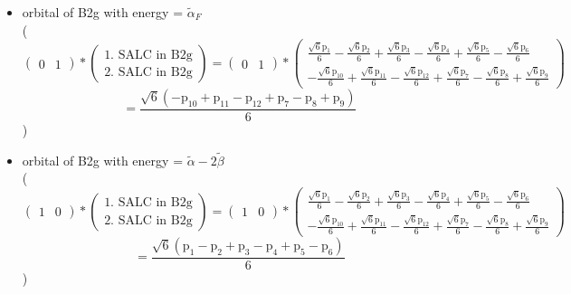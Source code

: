 \documentclass[12pt,a4paper]{article}
\begin{document}
\begin{itemize}
\textcolor{red}{Error in Orthogonalization of SALCs}\item orbital of B2g with energy = 
                                $\tilde{\alpha}_{F}$ \\
( 
$$
\begin{pmatrix}0 & 1\end{pmatrix} * \left(\begin{array}{c}\text{1. SALC in B2g} \\ \text{2. SALC in B2g}\end{array}\right) = \begin{pmatrix}0 & 1\end{pmatrix} * \begin{pmatrix}\frac{\sqrt{6} \text{p}_{1}}{6} - \frac{\sqrt{6} \text{p}_{2}}{6} + \frac{\sqrt{6} \text{p}_{3}}{6} - \frac{\sqrt{6} \text{p}_{4}}{6} + \frac{\sqrt{6} \text{p}_{5}}{6} - \frac{\sqrt{6} \text{p}_{6}}{6}\\- \frac{\sqrt{6} \text{p}_{10}}{6} + \frac{\sqrt{6} \text{p}_{11}}{6} - \frac{\sqrt{6} \text{p}_{12}}{6} + \frac{\sqrt{6} \text{p}_{7}}{6} - \frac{\sqrt{6} \text{p}_{8}}{6} + \frac{\sqrt{6} \text{p}_{9}}{6}\end{pmatrix} 
 $$ $$ = \frac{\sqrt{6} \left(- \text{p}_{10} + \text{p}_{11} - \text{p}_{12} + \text{p}_{7} - \text{p}_{8} + \text{p}_{9}\right)}{6} 
 $$ 
 )

\item orbital of B2g with energy = 
                                $\tilde{\alpha} - 2 \tilde{\beta}$ \\
( 
$$
\begin{pmatrix}1 & 0\end{pmatrix} * \left(\begin{array}{c}\text{1. SALC in B2g} \\ \text{2. SALC in B2g}\end{array}\right) = \begin{pmatrix}1 & 0\end{pmatrix} * \begin{pmatrix}\frac{\sqrt{6} \text{p}_{1}}{6} - \frac{\sqrt{6} \text{p}_{2}}{6} + \frac{\sqrt{6} \text{p}_{3}}{6} - \frac{\sqrt{6} \text{p}_{4}}{6} + \frac{\sqrt{6} \text{p}_{5}}{6} - \frac{\sqrt{6} \text{p}_{6}}{6}\\- \frac{\sqrt{6} \text{p}_{10}}{6} + \frac{\sqrt{6} \text{p}_{11}}{6} - \frac{\sqrt{6} \text{p}_{12}}{6} + \frac{\sqrt{6} \text{p}_{7}}{6} - \frac{\sqrt{6} \text{p}_{8}}{6} + \frac{\sqrt{6} \text{p}_{9}}{6}\end{pmatrix} 
 $$ $$ = \frac{\sqrt{6} \left(\text{p}_{1} - \text{p}_{2} + \text{p}_{3} - \text{p}_{4} + \text{p}_{5} - \text{p}_{6}\right)}{6} 
 $$ 
 )


\end{itemize}
\end{document}

